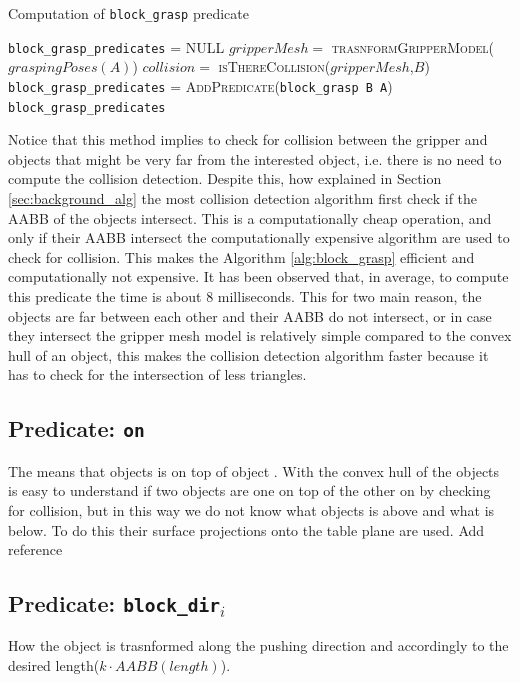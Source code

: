 \begin{algorithm}
\caption{Computation of \texttt{block\_grasp} predicate}\label{alg:block_grasp}
\begin{algorithmic}
  \texttt{block\_grasp\_predicates} = \textsc{NULL}
  \State $gripperMesh =$ \textsc{trasnformGripperModel}($graspingPoses(A)$)
	\State $collision =$ \textsc{isThereCollision($gripperMesh$,$B$)}
		\State \texttt{block\_grasp\_predicates} = \textsc{AddPredicate}(\texttt{block\_grasp B A})
	\EndIf
  \EndIf
\EndFor
\EndFor \\
\Return  \texttt{block\_grasp\_predicates}
\EndProcedure
\end{algorithmic}
\end{algorithm}   
 
Notice that this method implies to check for collision between the gripper and objects that might be very far from the interested object, i.e. there is no need to compute the collision detection.  Despite this, how explained in Section \ref{sec:background_alg} the most collision detection algorithm first check if the AABB of the objects intersect. This is a computationally cheap operation, and only if their AABB intersect the computationally expensive algorithm are used to check for collision. This makes the Algorithm \ref{alg:block_grasp} efficient and computationally not expensive. It has been observed that, in average, to compute this predicate the time is about $8$ milliseconds. This for two main reason, the objects are far between each other and their AABB do not intersect, or in case they intersect the gripper mesh model is relatively simple compared to the convex hull of an object, this makes the collision detection algorithm faster because it has to check for the intersection of less triangles. 
 
\subsection{Predicate: \texttt{on}}
The  means that objects  is on top of object . With the convex hull of the objects is easy to understand if two objects are one on top of the other on by checking for collision, but in this way we do not know what objects is above and what is below. To do this their surface projections onto the table plane are used. Add reference

\subsection{Predicate: \texttt{block\_dir$_i$}}
How the object is trasnformed along the pushing direction and accordingly to the desired length($k \cdot AABB(length)$).


